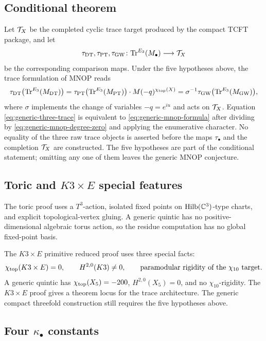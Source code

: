 \subsection{Conditional theorem}

Let \(\mathcal{T}_X\) be the completed cyclic trace target produced by the
compact TCFT package, and let
\[
  \tau_{\mathrm{DT}},\tau_{\mathrm{PT}},\tau_{\mathrm{GW}} \colon
  \mathrm{Tr}^{E_3}(M_\bullet)\longrightarrow \mathcal{T}_X
\]
be the corresponding comparison maps.  Under the five hypotheses above,
the trace formulation of MNOP reads
\begin{equation}
  \tau_{\mathrm{DT}}\bigl(\mathrm{Tr}^{E_3}(M_{\mathrm{DT}})\bigr)
  =
  \tau_{\mathrm{PT}}\bigl(\mathrm{Tr}^{E_3}(M_{\mathrm{PT}})\bigr)\cdot M(-q)^{\chi_{\mathrm{top}}(X)}
  =
  \sigma^{-1}\tau_{\mathrm{GW}}\bigl(\mathrm{Tr}^{E_3}(M_{\mathrm{GW}})\bigr),
  \label{eq:generic-three-trace}
\end{equation}
where \(\sigma\) implements the change of variables \(-q=e^{iu}\) and
acts on \(\mathcal{T}_X\).  Equation
\eqref{eq:generic-three-trace} is equivalent to
\eqref{eq:generic-mnop-formula} after dividing by
\eqref{eq:generic-mnop-degree-zero} and applying the enumerative
character.  No equality of the three raw trace objects is asserted
before the maps \(\tau_\bullet\) and the completion \(\mathcal{T}_X\) are
constructed.  The five hypotheses are part of the conditional
statement; omitting any one of them leaves the generic MNOP conjecture.

\subsection{Toric and \(K3\times E\) special features}

The toric proof uses a \(T^3\)-action, isolated fixed points on
\(\mathrm{Hilb}(\mathbb{C}^3)\)-type charts, and explicit topological-vertex
gluing.  A generic quintic has no positive-dimensional
algebraic torus action, so the residue computation has no global
fixed-point basis.

The \(K3\times E\) primitive reduced proof uses three special facts:
\[
  \chi_{\mathrm{top}}(K3\times E)=0,\qquad
  H^{2,0}(K3)\neq 0,\qquad
  \text{paramodular rigidity of the }\chi_{10}\text{ target}.
\]
A generic quintic has \(\chi_{\mathrm{top}}(X_5)=-200\), \(H^{2,0}(X_5)=0\), and no
\(\chi_{10}\)-rigidity.  The \(K3\times E\) proof gives a theorem
locus for the trace architecture.  The generic compact threefold
construction still requires the five hypotheses above.

\subsection{Four \(\kappa_\bullet\) constants}
\label{subsec:generic-cy3-invariants}

